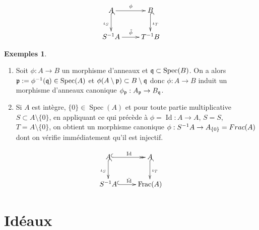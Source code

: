 \documentclass[a4paper, oneside, 12pt]{book}
\theoremstyle{theoremeStyle} %
\theoremstyle{definition} %
\newtheorem{exemples}[theoreme]{Exemples}
\DeclareMathOperator{\Spec}{Spec}
\DeclareMathOperator{\Frac}{Frac}
\DeclareMathOperator{\Id}{Id}
\begin{document}
	$$\xymatrix{
		A \ar[r]^\phi \ar@{^{(}->}[d]_{\iota_S} & B \ar@{^{(}->}[d]^{\iota_T} \\
		S^{-1}A \ar[r]^{\tilde{\phi}} & T^{-1}B
	}$$

\begin{exemples}
\begin{enumerate}
\item \label{LocMorphismes}Soit $\phi:A\rightarrow B$ un morphisme d'anneaux et $\frak{q}\subset \Spec(B)$. On a alors $\frak{p}:=\phi^{-1}(\frak{q})\in \Spec(A)$ et $\phi(A\setminus \frak{p})\subset B\setminus \frak{q}$ donc $\phi:A\rightarrow B$ induit un morphisme d'anneaux canonique $\phi_\frak{p}:A_{\frak{p}}\rightarrow B_{\frak{q}}$.
 \item Si $A$ est intègre,  $\lbrace 0\rbrace\in \Spec(A)$ et pour toute partie multiplicative $S\subset A\setminus \lbrace 0\rbrace$, en appliquant ce qui précède à $\phi=\Id:A\rightarrow A$, $S=S$, $T=A\setminus \lbrace 0\rbrace$, on obtient un morphisme canonique $\phi:S^{-1}A\rightarrow A_{\lbrace 0\rbrace}=\\Frac(A)$ dont on vérifie immédiatement qu'il est injectif.
\end{enumerate}

	$$ \xymatrix{
		A \ar@{^{(}->>}[r]^{\mathrm{Id} } \ar@{^{(}->}[d]_{\iota_S} & A \ar@{^{(}->}[d]^{\iota_T} \\
		S^{-1}A \ar@{^{(}->}[r]^{\tilde{\mathrm{Id} } } & \mathrm{\Frac}(A) }
	$$
\end{exemples}
\section{Idéaux}\label{LocIdeal}
\end{document}
